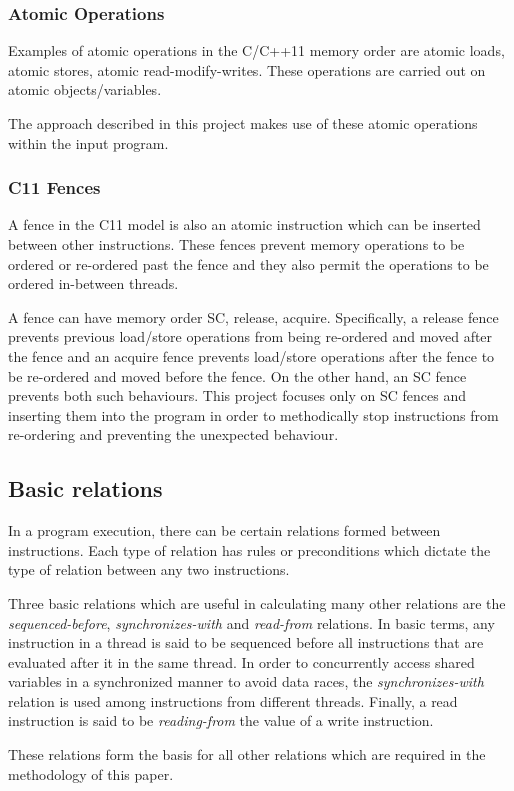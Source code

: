\subsubsection{Atomic Operations}
Examples of atomic operations in the C/C++11 memory order are atomic loads, atomic stores, atomic read-modify-writes. These operations are carried out on atomic objects/variables.


The approach described in this project makes use of these atomic operations within the input program.

\subsubsection{C11 Fences}
\par
A fence in the C11 model is also an atomic instruction which can be inserted between other instructions. These fences prevent memory operations to be ordered or re-ordered past the fence and they also permit the operations to be ordered in-between threads. 

\par
A fence can have memory order SC, release, acquire. Specifically, a release fence prevents previous load/store operations from being re-ordered and moved after the fence and an acquire fence prevents load/store operations after the fence to be re-ordered and moved before the fence. On the other hand, an SC fence prevents both such behaviours. This project focuses only on SC fences and inserting them into the program in order to methodically stop instructions from re-ordering and preventing the unexpected behaviour.

\subsection{Basic relations}
\par
In a program execution, there can be certain relations formed between instructions. Each type of relation has rules or preconditions which dictate the type of relation between any two instructions.

\par
Three basic relations which are useful in calculating many other relations are the \textit{sequenced-before}, \textit{synchronizes-with} and \textit{read-from} relations. In basic terms, any instruction in a thread is said to be sequenced before all instructions that are evaluated after it in the same thread. In order to concurrently access shared variables in a synchronized manner to avoid data races, the \textit{synchronizes-with} relation is used among instructions from different threads. Finally, a read instruction is said to be \textit{reading-from} the value of a write instruction.

These relations form the basis for all other relations which are required in the methodology of this paper.